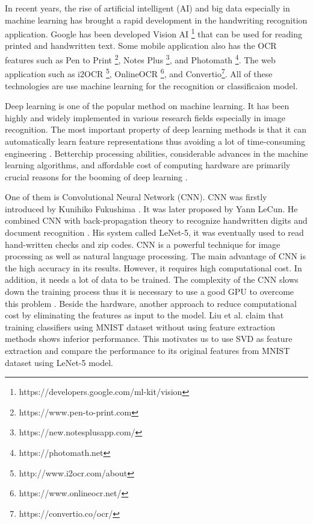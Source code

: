 \documentclass[conference]{IEEEtran}
\begin{document}
In recent years, the rise of artificial intelligent (AI) and big data especially in machine learning has brought a rapid
development in the handwriting recognition application. 
Google has been developed Vision AI \footnote{https://developers.google.com/ml-kit/vision} that can be used for reading printed and handwritten text. 
Some mobile application also has the OCR features such as Pen to Print \footnote{https://www.pen-to-print.com},
Notes Plus \footnote{https://new.notesplusapp.com/}, and
Photomath \footnote{https://photomath.net}. The web application such as i2OCR \footnote{http://www.i2ocr.com/about}, OnlineOCR \footnote{https://www.onlineocr.net/},
and Convertio\footnote{https://convertio.co/ocr/}. All of these technologies are use machine learning for the recognition or classificaion model. 

Deep learning is one of the popular method on machine learning. It has been highly and widely implemented in various research fields especially in image recognition.
The most important property of deep learning methods is that it can automatically learn feature representations thus avoiding a lot of time-consuming engineering \cite{musab2017deep}.
Betterchip processing abilities, considerable advances in the machine learning algorithms, and affordable cost of computing hardware are primarily crucial reasons for the booming of deep learning \cite{lecun2015deep}.

One of them is Convolutional Neural Network (CNN). CNN  was firstly  introduced  by Kunihiko  Fukushima  \cite{fukushima1980neocognitron}. It  was  later proposed  by  Yann 
LeCun.  He  combined  CNN  with  back-propagation  theory  to  recognize  handwritten  digits  and 
document recognition \cite{lecun1990handwritten,lenet-5}. His system called LeNet-5, it was eventually used to read hand-written checks and zip codes.
CNN is a powerful technique for image processing as well as natural language processing. 
The main advantage of CNN is the high accuracy in its results. However, it requires high computational cost. 
In addition, it needs a lot of data to be trained. The complexity of the CNN slows down the training process thus it is necessary to use a good GPU to overcome this problem \cite{alsaafin2017minimal}.
Beside the hardware, another approach to reduce computational cost by eliminating the features as input to the model. 
Liu et al. \cite{liu2008classification} claim that training classifiers using MNIST dataset without using feature extraction methods shows inferior performance.
This motivates us to use SVD as feature extraction and compare the performance to its original features from MNIST dataset using LeNet-5 model. 
\end{document}
